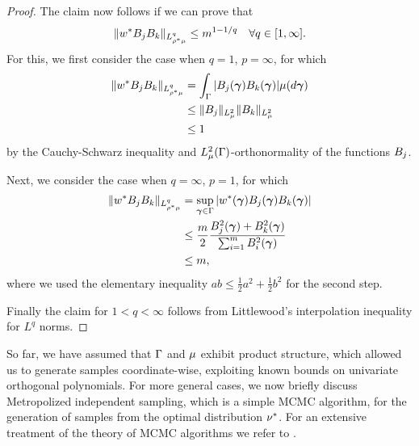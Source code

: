 \begin{proof}
	The claim now follows if we can prove that
	\begin{equation*}
	\|w^{*} B_jB_k\|_{L^q_{\rho^{*}\mu}}\leq m^{1-1/q}\quad\forall q\in[1,\infty].
	\end{equation*}
	For this, we first consider the case when $q=1$, $p=\infty$, for which
	\begin{equation*}
	\begin{split}
	\|w^{*} B_jB_k\|_{L^q_{\rho^{*}\mu}}&=\int_{\Gamma}|B_j(\bm{\gamma})B_k(\bm{\gamma})|\mu(d\bm{\gamma})\\
	&\leq \|B_j\|_{L^2_{\mu}}\|B_k\|_{L^2_{\mu}}\\
	&\leq 1
	\end{split}
	\end{equation*}
	by the Cauchy-Schwarz inequality and $L^2_{\mu}(\Gamma)$-orthonormality of the functions $B_j$.

	Next, we consider the case when $q=\infty$, $p=1$, for which
	\begin{equation*}
	\begin{split}
	\|w^{*} B_jB_k\|_{L^q_{\rho^{*}\mu}}&=\sup_{\bm{\gamma}\in \Gamma}|w^{*}(\bm{\gamma})B_j(\bm{\gamma})B_k(\bm{\gamma})|\\
	&\leq \frac{m}{2}\frac{B_j^2(\bm{\gamma})+B_k^2(\bm{\gamma})}{\sum_{i=1}^{m}B_i^2(\bm{\gamma})}\\
	&\leq m,
	\end{split}
	\end{equation*}
	where we used the elementary inequality $ab\leq \frac{1}{2}a^2+\frac{1}{2}b^2$ for the second step.

	Finally the claim for $1<q<\infty$ follows from Littlewood's interpolation inequality for $L^q$ norms.
\end{proof}

So far, we have assumed that $\Gamma$ and $\mu$ exhibit product structure, which allowed us to generate samples coordinate-wise, exploiting known bounds on univariate orthogonal polynomials. 
For more general cases, we now briefly discuss Metropolized independent sampling, which is a simple MCMC algorithm, for the generation of samples from the optimal distribution $\nu^{*}$. For an extensive treatment of the theory of MCMC algorithms we refer to \cite{liu2008monte}.

